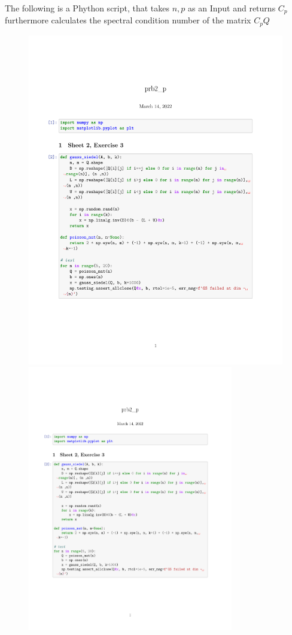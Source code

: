 \subsubsection{}
The following is a Phython script, that takes $n, p$ as an Input and returns
$C_p$ furthermore calculates the spectral condition number of the matrix
$C_pQ$
\begin{figure}[htpb]
    \centering
    \includegraphics[page=2 ,width=\textwidth, clip=true, trim=0cm 7cm 0cm
    3cm]{./prog/prb2_p.pdf}
    \includegraphics[page=3 ,width=0.8\textwidth, clip=true, trim=0cm 17cm 0cm
    2.5cm]{./prog/prb2_p.pdf}
\end{figure}


